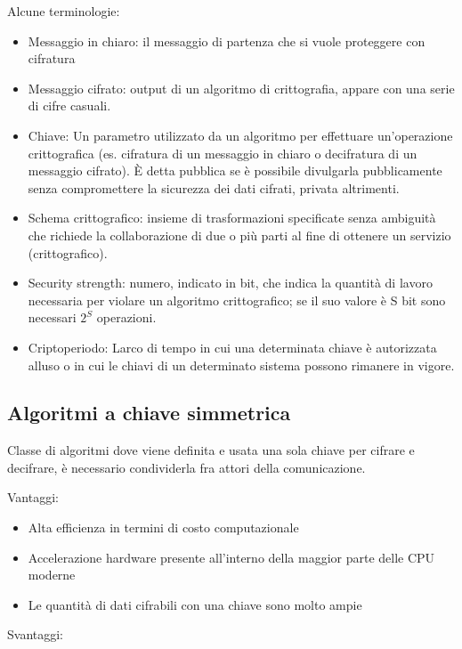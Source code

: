 Alcune terminologie:

\begin{itemize}
\item
  Messaggio in chiaro: il messaggio di partenza che si vuole proteggere
  con cifratura
\item
  Messaggio cifrato: output di un algoritmo di crittografia, appare con
  una serie di cifre casuali.
\item
  Chiave: Un parametro utilizzato da un algoritmo per effettuare
  un'operazione crittografica (es. cifratura di un messaggio in chiaro o
  decifratura di un messaggio cifrato). È detta pubblica se è possibile
  divulgarla pubblicamente senza compromettere la sicurezza dei dati
  cifrati, privata altrimenti.
\item
  Schema crittografico: insieme di trasformazioni specificate senza
  ambiguità che richiede la collaborazione di due o più parti al fine di
  ottenere un servizio (crittografico).
\item
  Security strength: numero, indicato in bit, che indica la quantità di
  lavoro necessaria per violare un algoritmo crittografico; se il suo
  valore è S bit sono necessari \(2^{S}\) operazioni.
\item
  Criptoperiodo: L\textquotesingle arco di tempo in cui una determinata
  chiave è autorizzata all\textquotesingle uso o in cui le chiavi di un
  determinato sistema possono rimanere in vigore.
\end{itemize}

\subsection{Algoritmi a chiave
simmetrica}\label{algoritmi-a-chiave-simmetrica}

Classe di algoritmi dove viene definita e usata una sola chiave per
cifrare e decifrare, è necessario condividerla fra attori della
comunicazione.

Vantaggi:

\begin{itemize}
\item
  Alta efficienza in termini di costo computazionale
\item
  Accelerazione hardware presente all'interno della maggior parte delle
  CPU moderne
\item
  Le quantità di dati cifrabili con una chiave sono molto ampie
\end{itemize}

Svantaggi:

